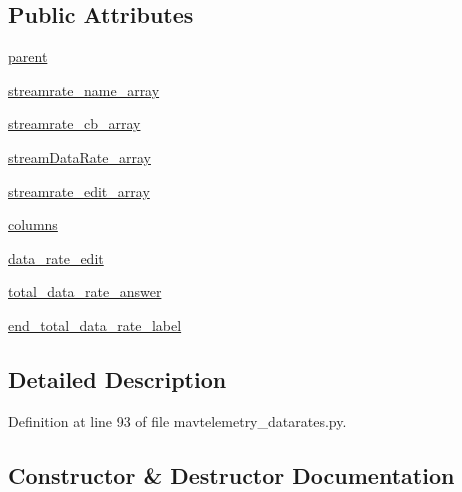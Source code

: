 \subsection*{Public Attributes}
\begin{DoxyCompactItemize}
\item 
\mbox{\hyperlink{classpymavlink_1_1tools_1_1mavtelemetry__datarates_1_1MainWindow_a024185a438507965e75c08edf52510a4}{parent}}
\item 
\mbox{\hyperlink{classpymavlink_1_1tools_1_1mavtelemetry__datarates_1_1MainWindow_a85bc1c05549a1191cefc38487ccb6da9}{streamrate\+\_\+name\+\_\+array}}
\item 
\mbox{\hyperlink{classpymavlink_1_1tools_1_1mavtelemetry__datarates_1_1MainWindow_a53fd1d72b518c7d42ad44f58b6ea12b8}{streamrate\+\_\+cb\+\_\+array}}
\item 
\mbox{\hyperlink{classpymavlink_1_1tools_1_1mavtelemetry__datarates_1_1MainWindow_ad56a30334f91d90ebca9a2dd3fad430b}{stream\+Data\+Rate\+\_\+array}}
\item 
\mbox{\hyperlink{classpymavlink_1_1tools_1_1mavtelemetry__datarates_1_1MainWindow_a17efb190666d9acaaf1bbd0182569438}{streamrate\+\_\+edit\+\_\+array}}
\item 
\mbox{\hyperlink{classpymavlink_1_1tools_1_1mavtelemetry__datarates_1_1MainWindow_ad9776d1f379adca348d428b202850c97}{columns}}
\item 
\mbox{\hyperlink{classpymavlink_1_1tools_1_1mavtelemetry__datarates_1_1MainWindow_a67e44ed658818a42b13b3efbf430d75e}{data\+\_\+rate\+\_\+edit}}
\item 
\mbox{\hyperlink{classpymavlink_1_1tools_1_1mavtelemetry__datarates_1_1MainWindow_aba31501c3ddaf065302970566efaa7f3}{total\+\_\+data\+\_\+rate\+\_\+answer}}
\item 
\mbox{\hyperlink{classpymavlink_1_1tools_1_1mavtelemetry__datarates_1_1MainWindow_a541e309170d776794b25bc14ac726a5d}{end\+\_\+total\+\_\+data\+\_\+rate\+\_\+label}}
\end{DoxyCompactItemize}


\subsection{Detailed Description}


Definition at line 93 of file mavtelemetry\+\_\+datarates.\+py.



\subsection{Constructor \& Destructor Documentation}
\mbox{\label{classpymavlink_1_1tools_1_1mavtelemetry__datarates_1_1MainWindow_a3255d9828cde81eb91d8bdf7a907b50b}} 
